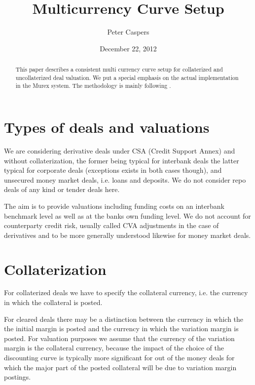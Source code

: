 \documentclass{amsart}
\theoremstyle{plain}
\numberwithin{equation}{section}
\begin{document}
\title[Multicurrency Curve Setup]{Multicurrency Curve Setup}
\author{Peter Caspers}
\date{December 22, 2012}
\begin{abstract}
This paper describes a consistent multi currency curve setup for collaterized and uncollaterized deal valuation. We put a special emphasis on the actual implementation in the Murex system. The methodology is mainly following \cite{Fuji}. 
\end{abstract}

\maketitle

\section{Types of deals and valuations}

We are considering derivative deals under CSA (Credit Support Annex) and without collaterization, the former being typical for interbank deals the latter typical for corporate deals (exceptions exists in both cases though), and unsecured money market deals, i.e. loans and deposits. We do not consider repo deals of any kind or tender deals here.

The aim is to provide valuations including funding costs on an interbank benchmark level as well as at the banks own funding level. We do not account for counterparty credit risk, usually called CVA adjustments in the case of derivatives and to be more generally understood likewise for money market deals.

\section{Collaterization}

For collaterized deals we have to specify the collateral currency, i.e. the currency in which the collateral is posted. 

For cleared deals there may be a distinction between the currency in which the the initial margin is posted and the currency in which the variation margin is posted. For valuation purposes we assume that the currency of the variation margin is the collateral currency, because the impact of the choice of the discounting curve is typically more significant for out of the money deals for which the major part of the posted collateral will be due to variation margin postings.
\end{document}
